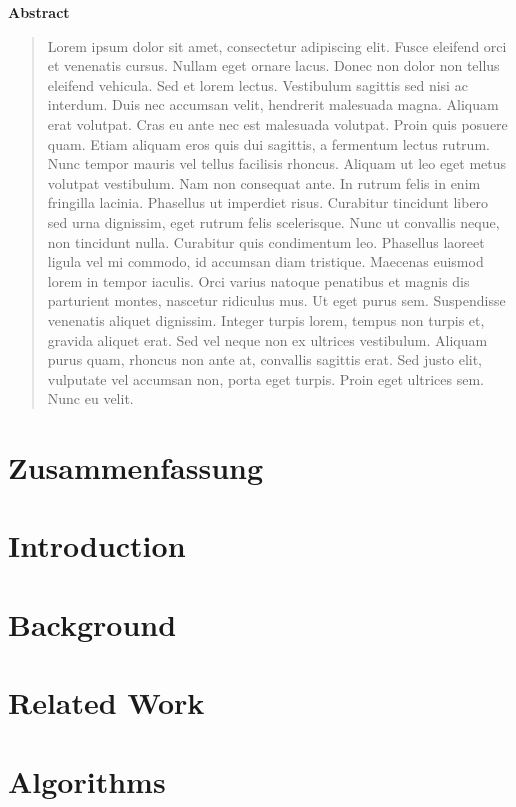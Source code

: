 \documentclass[12pt]{scrbook}
\newcommand{\abstractname}{Abstract}
\newenvironment{abstract}{
    \begin{center}
    \bfseries \abstractname
    \end{center}
    \begin{quote}
}{
    \end{quote}
}
\begin{document}
\begin{abstract}
    Lorem ipsum dolor sit amet, consectetur adipiscing elit. Fusce eleifend orci
    et venenatis cursus. Nullam eget ornare lacus. Donec non dolor non tellus
    eleifend vehicula. Sed et lorem lectus. Vestibulum sagittis sed nisi ac interdum.
    Duis nec accumsan velit, hendrerit malesuada magna. Aliquam erat volutpat.
    Cras eu ante nec est malesuada volutpat. Proin quis posuere quam. Etiam aliquam
    eros quis dui sagittis, a fermentum lectus rutrum. Nunc tempor mauris vel tellus
    facilisis rhoncus. Aliquam ut leo eget metus volutpat vestibulum.
    Nam non consequat ante. In rutrum felis in enim fringilla lacinia.
    Phasellus ut imperdiet risus. Curabitur tincidunt libero sed urna dignissim,
    eget rutrum felis scelerisque. Nunc ut convallis neque, non tincidunt nulla.
    Curabitur quis condimentum leo. Phasellus laoreet ligula vel mi commodo, id
    accumsan diam tristique. Maecenas euismod lorem in tempor iaculis.
    Orci varius natoque penatibus et magnis dis parturient montes, nascetur
    ridiculus mus. Ut eget purus sem. Suspendisse venenatis aliquet dignissim.
    Integer turpis lorem, tempus non turpis et, gravida aliquet erat. Sed vel
    neque non ex ultrices vestibulum. Aliquam purus quam, rhoncus non ante at,
    convallis sagittis erat. Sed justo elit, vulputate vel accumsan non, porta eget
    turpis. Proin eget ultrices sem. Nunc eu velit.
\end{abstract}
\thispagestyle{empty}

\chapter*{Zusammenfassung}

\thispagestyle{empty}

\tableofcontents


\chapter{Introduction}


\chapter{Background}


\chapter{Related Work}


\chapter{Algorithms}


\printbibliography
\end{document}
